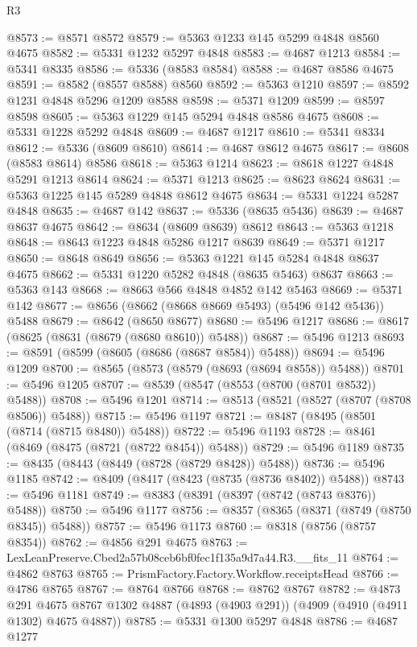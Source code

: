 \begin{lexlean}{R3}
\begin{coremodule}
@8573 := @8571 @8572
@8579 := @5363 @1233 @145 @5299 @4848 @8560 @4675
@8582 := @5331 @1232 @5297 @4848
@8583 := @4687 @1213
@8584 := @5341 @8335
@8586 := @5336 (@8583 @8584)
@8588 := @4687 @8586 @4675
@8591 := @8582 (@8557 @8588) @8560
@8592 := @5363 @1210
@8597 := @8592 @1231 @4848 @5296 @1209 @8588
@8598 := @5371 @1209
@8599 := @8597 @8598
@8605 := @5363 @1229 @145 @5294 @4848 @8586 @4675
@8608 := @5331 @1228 @5292 @4848
@8609 := @4687 @1217
@8610 := @5341 @8334
@8612 := @5336 (@8609 @8610)
@8614 := @4687 @8612 @4675
@8617 := @8608 (@8583 @8614) @8586
@8618 := @5363 @1214
@8623 := @8618 @1227 @4848 @5291 @1213 @8614
@8624 := @5371 @1213
@8625 := @8623 @8624
@8631 := @5363 @1225 @145 @5289 @4848 @8612 @4675
@8634 := @5331 @1224 @5287 @4848
@8635 := @4687 @142
@8637 := @5336 (@8635 @5436)
@8639 := @4687 @8637 @4675
@8642 := @8634 (@8609 @8639) @8612
@8643 := @5363 @1218
@8648 := @8643 @1223 @4848 @5286 @1217 @8639
@8649 := @5371 @1217
@8650 := @8648 @8649
@8656 := @5363 @1221 @145 @5284 @4848 @8637 @4675
@8662 := @5331 @1220 @5282 @4848 (@8635 @5463) @8637
@8663 := @5363 @143
@8668 := @8663 @566 @4848 @4852 @142 @5463
@8669 := @5371 @142
@8677 := @8656 (@8662 (@8668 @8669 @5493) (@5496 @142 @5436)) @5488
@8679 := @8642 (@8650 @8677)
@8680 := @5496 @1217
@8686 := @8617 (@8625 (@8631 (@8679 (@8680 @8610)) @5488))
@8687 := @5496 @1213
@8693 := @8591 (@8599 (@8605 (@8686 (@8687 @8584)) @5488))
@8694 := @5496 @1209
@8700 := @8565 (@8573 (@8579 (@8693 (@8694 @8558)) @5488))
@8701 := @5496 @1205
@8707 := @8539 (@8547 (@8553 (@8700 (@8701 @8532)) @5488))
@8708 := @5496 @1201
@8714 := @8513 (@8521 (@8527 (@8707 (@8708 @8506)) @5488))
@8715 := @5496 @1197
@8721 := @8487 (@8495 (@8501 (@8714 (@8715 @8480)) @5488))
@8722 := @5496 @1193
@8728 := @8461 (@8469 (@8475 (@8721 (@8722 @8454)) @5488))
@8729 := @5496 @1189
@8735 := @8435 (@8443 (@8449 (@8728 (@8729 @8428)) @5488))
@8736 := @5496 @1185
@8742 := @8409 (@8417 (@8423 (@8735 (@8736 @8402)) @5488))
@8743 := @5496 @1181
@8749 := @8383 (@8391 (@8397 (@8742 (@8743 @8376)) @5488))
@8750 := @5496 @1177
@8756 := @8357 (@8365 (@8371 (@8749 (@8750 @8345)) @5488))
@8757 := @5496 @1173
@8760 := @8318 (@8756 (@8757 @8354))
@8762 := @4856 @291 @4675
@8763 := LexLeanPreserve.Cbed2a57b08ceb6bf0fec1f135a9d7a44.R3.__fits_11
@8764 := @4862 @8763
@8765 := PrismFactory.Factory.Workflow.receiptsHead
@8766 := @4786 @8765
@8767 := @8764 @8766
@8768 := @8762 @8767
@8782 := @4873
    @291
    @4675
    @8767
    @1302
    @4887
    (@4893 (@4903 @291))
    (@4909 (@4910 (@4911 @1302) @4675 @4887))
@8785 := @5331 @1300 @5297 @4848
@8786 := @4687 @1277

\end{coremodule}
\end{lexlean}
